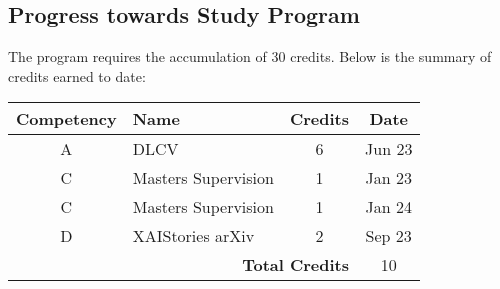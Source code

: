 \subsection*{Progress towards Study Program}
The program requires the accumulation of 30 credits. Below is the summary of credits earned to date:

\begin{tabular}{|c|l|c|c|}
    \hline
    \textbf{Competency} & \textbf{Name}             & \textbf{Credits} & \textbf{Date}   \\ \hline
    A                   & DLCV                      & 6                & Jun 23         \\ \hline
    C                   & Masters Supervision       & 1                & Jan 23        \\ \hline
    C                   & Masters Supervision       & 1                & Jan 24        \\ \hline
    D                   & XAIStories arXiv          & 2                & Sep 23        \\ \hline
    \multicolumn{3}{|r|}{\textbf{Total Credits}}   & 10               \\ \hline
\end{tabular}